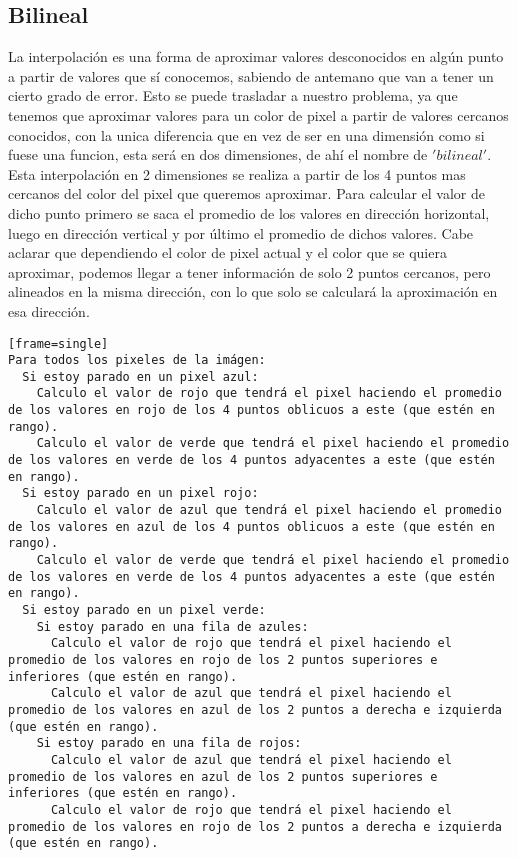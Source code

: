 \subsection{Bilineal}

La interpolación es una forma de aproximar valores desconocidos en algún punto a partir de valores que sí conocemos, sabiendo de antemano que van a tener un cierto grado de error. Esto se puede trasladar a nuestro problema, ya que tenemos que aproximar valores para un color de pixel a partir de valores cercanos conocidos, con la unica diferencia que en vez de ser en una dimensión como si fuese una funcion, esta será en dos dimensiones, de ahí el nombre de $'bilineal'$. Esta interpolación en 2 dimensiones se realiza a partir de los 4 puntos mas cercanos del color del pixel que queremos aproximar. Para calcular el valor de dicho punto primero se saca el promedio de los valores en dirección horizontal, luego en dirección vertical y por último el promedio de dichos valores. Cabe aclarar que dependiendo el color de pixel actual y el color que se quiera aproximar, podemos llegar a tener información de solo 2 puntos cercanos, pero alineados en la misma dirección, con lo que solo se calculará la aproximación en esa dirección.
\begin{verbatim}[frame=single] 
Para todos los pixeles de la imágen:
  Si estoy parado en un pixel azul:
    Calculo el valor de rojo que tendrá el pixel haciendo el promedio de los valores en rojo de los 4 puntos oblicuos a este (que estén en rango).
    Calculo el valor de verde que tendrá el pixel haciendo el promedio de los valores en verde de los 4 puntos adyacentes a este (que estén en rango).
  Si estoy parado en un pixel rojo:
    Calculo el valor de azul que tendrá el pixel haciendo el promedio de los valores en azul de los 4 puntos oblicuos a este (que estén en rango).
    Calculo el valor de verde que tendrá el pixel haciendo el promedio de los valores en verde de los 4 puntos adyacentes a este (que estén en rango).
  Si estoy parado en un pixel verde:
    Si estoy parado en una fila de azules:
      Calculo el valor de rojo que tendrá el pixel haciendo el promedio de los valores en rojo de los 2 puntos superiores e inferiores (que estén en rango).
      Calculo el valor de azul que tendrá el pixel haciendo el promedio de los valores en azul de los 2 puntos a derecha e izquierda (que estén en rango).
    Si estoy parado en una fila de rojos:
      Calculo el valor de azul que tendrá el pixel haciendo el promedio de los valores en azul de los 2 puntos superiores e inferiores (que estén en rango).
      Calculo el valor de rojo que tendrá el pixel haciendo el promedio de los valores en rojo de los 2 puntos a derecha e izquierda (que estén en rango).  
\end{verbatim}



